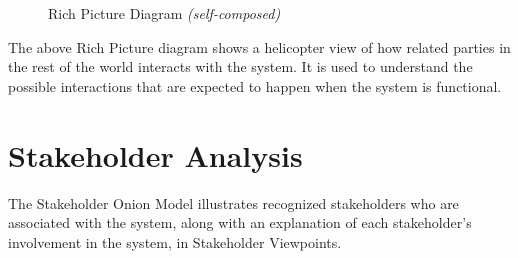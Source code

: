 \begin{figure}[h!]
\centering
{}
\caption{Rich Picture Diagram \textit{(self-composed)}}
\label{fig:rich-picture}
\end{figure}

The above Rich Picture diagram shows a helicopter view of how related parties in the rest of the world interacts with the system. It is used to understand the possible interactions that are expected to happen when the system is functional.

\section{Stakeholder Analysis}
The Stakeholder Onion Model illustrates recognized stakeholders who are associated with the system, along with an explanation of each stakeholder's involvement in the system, in Stakeholder Viewpoints.


